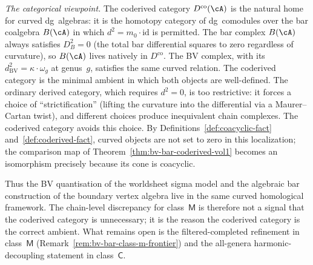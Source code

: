\begin{remark}
\emph{The categorical viewpoint.}
The coderived category $D^{\mathrm{co}}(\cA)$ is the natural
home for curved dg~algebras: it is the homotopy category of
dg~comodules over the bar coalgebra $B(\cA)$ in which
$d^2 = m_0 \cdot \mathrm{id}$ is permitted. The bar complex
$B(\cA)$ always satisfies $D_B^2 = 0$ (the total bar differential
squares to zero regardless of curvature), so $B(\cA)$ lives
natively in $D^{\mathrm{co}}$. The BV complex, with its
$d^2_{\mathrm{BV}} = \kappa \cdot \omega_g$ at genus~$g$,
satisfies the same curved relation. The coderived
category is the minimal ambient in which both objects are
well-defined. The ordinary derived
category, which requires $d^2 = 0$, is too restrictive: it
forces a choice of ``strictification'' (lifting the curvature
into the differential via a Maurer--Cartan twist), and different
choices produce inequivalent chain complexes. The coderived
category avoids this choice. By
Definitions~\ref{def:coacyclic-fact} and~\ref{def:coderived-fact},
curved objects are not set to zero in this localization; the
comparison map of Theorem~\ref{thm:bv-bar-coderived-vol1} becomes an
isomorphism precisely because its cone is coacyclic.

Thus the BV quantisation of the worldsheet sigma model and the
algebraic bar construction of the boundary vertex algebra live in the
same curved homological framework. The chain-level discrepancy for
class~$\mathsf{M}$ is therefore not a signal that the coderived
category is unnecessary; it is the reason the coderived category is
the correct ambient. What remains open is
the filtered-completed refinement in class~$\mathsf{M}$
\textup{(}Remark~\ref{rem:bv-bar-class-m-frontier}\textup{)} and the
all-genera harmonic-decoupling statement in class~$\mathsf{C}$.
\end{remark}

